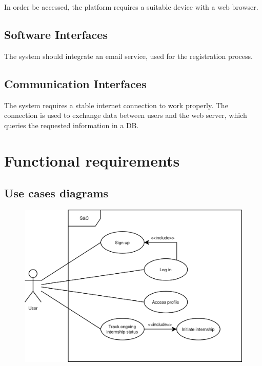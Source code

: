 In order be accessed, the platform requires a suitable device with a web browser.

\subsection{Software Interfaces}

The system should integrate an email service, used for the registration process.

\subsection{Communication Interfaces}

The system requires a stable internet connection to work properly.
The connection is used to exchange data between users and the web server, which queries the requested information in a DB.

\section{Functional requirements}

\subsection{Use cases diagrams}

\begin{figure}[H]
    \centering
    \includegraphics[width=0.3\linewidth]{../assets/use-case-diagrams/user-common.png}
\end{figure}

